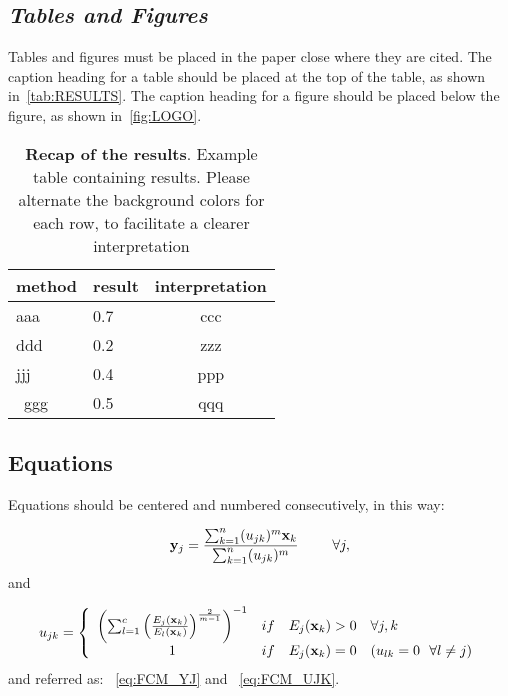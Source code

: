 \documentclass[12pt,a4paper]{cibb}
\begin{document}
\subsection{\bf \it Tables and Figures}
\label{sec:TABLES-AND-FIGURES}


Tables and  figures must be placed  in the paper close  where they are
cited.  The caption heading for a table should be placed at the top of
the table,  as shown in~\autoref{tab:RESULTS}.  The caption heading  for a
figure   should   be   placed   below   the  figure,   as   shown   in~\autoref{fig:LOGO}.

\begin{table}[httb!] \small
\centering
    \begin{tabularx}{0.35\textwidth}{ l  l  c }
        \toprule
          \textbf{method} & \textbf{result} & \textbf{interpretation} \\
        \midrule
        \rowcolor{LightBlue} aaa & 0.7 & ccc \\
         ddd & 0.2 & zzz \\
        \rowcolor{LightBlue}  jjj & 0.4 & ppp \\\
         ggg & 0.5 & qqq \\
        \bottomrule
    \end{tabularx}
    \caption{\textbf{Recap of the results}.
    Example table containing results.
    Please alternate the background colors for each row, to facilitate a clearer interpretation\label{tab:RESULTS}}
\end{table}





\subsection{Equations}
\label{sec:EQUATIONS}


Equations should be centered and numbered consecutively, in this way:

\begin{equation}
{\bf y}_{j} = \frac {\sum_{k=1}^{n} (u_{jk})^{m}{\bf x}_{k} }{
\sum_{k=1}^{n} ({ u}_{jk})^{m} } \, \, \ \mbox{\hspace{.5cm}  } \forall j,
\label{eq:FCM_YJ}
\end{equation}
and

\begin{equation}
u_{jk} =
\left\{
\begin{array}{clll}
\left( \sum_{l=1}^{c} \left( \frac {E_{j}({\bf x}_{k})}{E_{l}({\bf x}_{k})}
\right)^\frac{2}{m-1} \right)^{-1} & if & E_{j}({\bf x}_{k})>0 & \forall j,k \\
1 & if & E_{j}({\bf x}_{k})=0 & (u_{lk}=0 \ \ \forall l \neq j) \\
\end{array}
\right.
\label{eq:FCM_UJK}
\end{equation}
and referred as: ~\autoref{eq:FCM_YJ} and ~\autoref{eq:FCM_UJK}.
\end{document}
